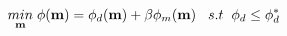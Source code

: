 \vspace{-0.1cm}
\begin{equation}
    \underset{\mathbf{m}}{min} \; \phi(\mathbf{m}) = \phi_{d}(\mathbf{m}) + \beta\phi_{m}(\mathbf{m}) \hspace{3mm} s.t \hspace{2mm} \phi_d \leq \phi_d^*
    \label{eq:forward-pass}
    \vspace{-0.05cm}
\end{equation}